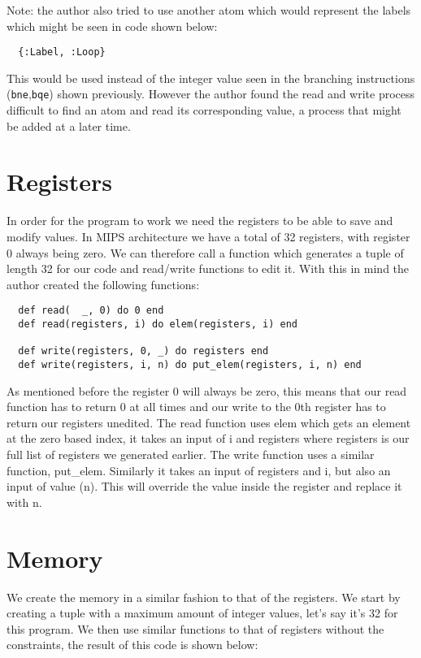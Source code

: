 \documentclass[a4paper,11pt]{article}
\begin{document}
Note: the author also tried to use another atom which would represent the labels which might be seen in code shown below:

\begin{verbatim}
  {:Label, :Loop}
\end{verbatim}

This would be used instead of the integer value seen in the branching instructions ({\tt bne},{\tt bqe}) shown previously. However the author found the read and write process difficult to find an atom and read its corresponding value, a process that might be added at a later time.

\section*{Registers}

In order for the program to work we need the registers to be able to save and modify values. In MIPS architecture we have a total of 32 registers, with register 0 always being zero. We can therefore call a function which generates a tuple of length 32 for our code and read/write functions to edit it. With this in mind the author created the following functions:

\begin{verbatim}
  def read(  _, 0) do 0 end
  def read(registers, i) do elem(registers, i) end

  def write(registers, 0, _) do registers end
  def write(registers, i, n) do put_elem(registers, i, n) end
\end{verbatim}

As mentioned before the register 0 will always be zero, this means that our read function has to return 0 at all times and our write to the 0th register has to return our registers unedited. The read function uses elem which gets an element at the zero based index, it takes an input of i and registers where registers is our full list of registers we generated earlier. The write function uses a similar function, put\_elem. Similarly it takes an input of registers and i, but also an input of value (n). This will override the value inside the register and replace it with n.

\section*{Memory}

We create the memory in a similar fashion to that of the registers. We start by creating a tuple with a maximum amount of integer values, let's say it's 32 for this program. We then use similar functions to that of registers without the constraints, the result of this code is shown below:
\end{document}
